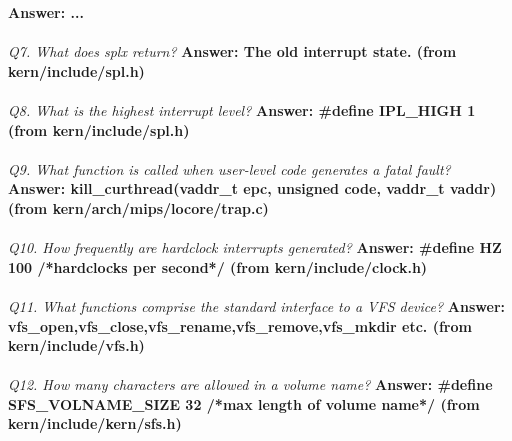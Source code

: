 \documentclass[11pt, english]{article}
\begin{document}
	\textbf{Answer: ...}\\ \\ 
	\textit{Q7. What does splx return?}\newline 
	\textbf{Answer: The old interrupt state. (from kern/include/spl.h)}\\ \\ 
	\textit{Q8. What is the highest interrupt level?}\newline 
	\textbf{Answer: \#define IPL\_HIGH 1 (from kern/include/spl.h)}\\ \\ 
	\textit{Q9. What function is called when user-level code generates a fatal fault?}\newline 
	\textbf{Answer: kill\_curthread(vaddr\_t epc, unsigned code, vaddr\_t vaddr) (from kern/arch/mips/locore/trap.c)}\\ \\ 
	\textit{Q10. How frequently are hardclock interrupts generated?}\newline 
	\textbf{Answer:	\#define HZ  100 /*hardclocks per second*/ (from kern/include/clock.h)}\\ \\ 
	\textit{Q11. What functions comprise the standard interface to a VFS device?}\newline 
	\textbf{Answer: vfs\_open,vfs\_close,vfs\_rename,vfs\_remove,vfs\_mkdir etc. (from kern/include/vfs.h)}\\ \\ 
	\textit{Q12. How many characters are allowed in a volume name?}\newline 
	\textbf{Answer: \#define SFS\_VOLNAME\_SIZE  32 /*max length of volume name*/ (from kern/include/kern/sfs.h)}\\ \\ 
\end{document}
